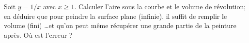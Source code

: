 \begin{exercice}\label{exoInter0016}

Soit $y = 1/x$ avec $x \geq 1$. Calculer l'aire sous la courbe et le volume de révolution; en déduire que pour peindre la surface plane (infinie), il suffit  de remplir le volume (fini) \ldots et qu'on peut même récupérer une grande partie de la peinture après. Où est l'erreur ?

\end{exercice}
